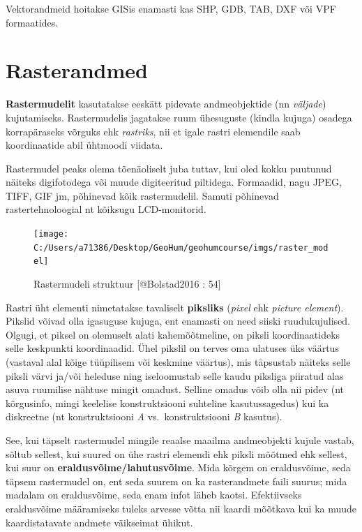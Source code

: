 \documentclass[
]{book}
\begin{document}
Vektorandmeid hoitakse GISis enamasti kas SHP, GDB, TAB, DXF või VPF formaatides.

\hypertarget{rasterandmed}{%
\section{Rasterandmed}\label{rasterandmed}}

\textbf{Rastermudelit} kasutatakse eeskätt pidevate andmeobjektide (nn \emph{väljade}) kujutamiseks. Rastermudelis jagatakse ruum ühesuguste (kindla kujuga) osadega korrapäraseks võrguks ehk \emph{rastriks}, nii et igale rastri elemendile saab koordinaatide abil ühtmoodi viidata.

Rastermudel peaks olema tõenäoliselt juba tuttav, kui oled kokku puutunud näiteks digifotodega või muude digiteeritud piltidega. Formaadid, nagu JPEG, TIFF, GIF jm, põhinevad kõik rastermudelil. Samuti põhinevad rastertehnoloogial nt kõiksugu LCD-monitorid.

\begin{figure}

{\centering \texttt{[image: C:/Users/a71386/Desktop/GeoHum/geohumcourse/imgs/raster\_model]} 

}

\caption{Rastermudeli struktuur [@Bolstad2016 : 54]}\label{fig:raster}
\end{figure}

Rastri üht elementi nimetatakse tavaliselt \textbf{piksliks} (\emph{pixel} ehk \emph{picture element}). Pikslid võivad olla igasuguse kujuga, ent enamasti on need siiski ruudukujulised. Olgugi, et piksel on olemuselt alati kahemõõtmeline, on piksli koordinaatideks selle keskpunkti koordinaadid. Ühel pikslil on terves oma ulatuses üks väärtus (vastaval alal kõige tüüpilisem või keskmine väärtus), mis täpsustab näiteks selle piksli värvi ja/või heleduse ning iseloomustab selle kaudu piksliga piiratud alas asuva ruumilise nähtuse mingit omadust. Selline omadus võib olla nii pidev (nt kõrgusinfo, mingi keelelise konstruktsiooni suhteline kasutussagedus) kui ka diskreetne (nt konstruktsiooni \emph{A} vs.~konstruktsiooni \emph{B} kasutus).

See, kui täpselt rastermudel mingile reaalse maailma andmeobjekti kujule vastab, sõltub sellest, kui suured on ühe rastri elemendi ehk piksli mõõtmed ehk sellest, kui suur on \textbf{eraldusvõime/lahutusvõime}. Mida kõrgem on eraldusvõime, seda täpsem rastermudel on, ent seda suurem on ka rasterandmete faili suurus; mida madalam on eraldusvõime, seda enam infot läheb kaotsi. Efektiivseks eraldusvõime määramiseks tuleks arvesse võtta nii kaardi mõõtkava kui ka muude kaardistatavate andmete väikseimat ühikut.
\end{document}
